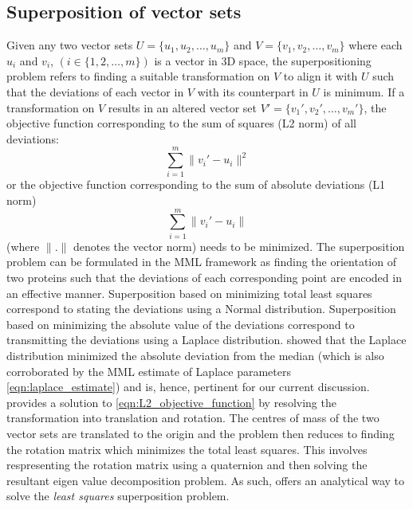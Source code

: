 \documentclass[wcp]{jmlr}
\begin{document}
\subsection{Superposition of vector sets}
Given any two vector sets $U = \{u_1,u_2,\ldots,u_m\}$ and $V = \{v_1,v_2,\ldots,v_m\}$
where each $u_i$ and $v_i$, $(i \in \{1,2,\ldots,m\})$ is a vector in 3D space, the 
superpositioning problem refers to finding a suitable transformation on $V$ to
align it with $U$ such that the deviations of each vector in $V$ with its counterpart
in $U$ is minimum. If a transformation on $V$ results in an altered vector set 
$V'=\{v_1',v_2',\ldots,v_m'\}$, the objective function corresponding to the
sum of squares (L2 norm) of all deviations: 
\begin{equation} 
  \sum_{i=1}^m \|v_i'-u_i\|^2 \label{eqn:L2_objective_function}
\end{equation} 
or the objective function corresponding to the sum of absolute deviations (L1 norm)
\begin{equation} 
  \sum_{i=1}^m \|v_i'-u_i\| \label{eqn:L1_objective_function}
\end{equation}
(where $\|.\|$ denotes the vector norm) needs to be minimized. 
The superposition problem can be formulated in the MML framework as finding the 
orientation of two proteins such that the deviations of each corresponding point
are encoded in an effective manner. Superposition based on minimizing total least
squares correspond to stating the deviations using a Normal distribution. 
Superposition based on minimizing the absolute value of the deviations correspond
to transmitting the deviations using a Laplace distribution. \citet{keynes-laplace} 
showed that the Laplace distribution minimized the absolute deviation from the median
(which is also corroborated by the MML estimate of Laplace parameters 
\eqref{eqn:laplace_estimate}) and is, hence, pertinent for our current discussion. \\

\citet{kearsley89} provides a solution to \eqref{eqn:L2_objective_function} by 
resolving the transformation into translation and rotation. The centres of mass of the
two vector sets are translated to the origin and the problem then reduces to finding the
rotation matrix which minimizes the total least squares. This involves respresenting
the rotation matrix using a quaternion and then solving the resultant eigen value 
decomposition problem. As such, \citet{kearsley89} offers an analytical way to solve
the \emph{least squares} superposition problem. \\
 
\end{document}
